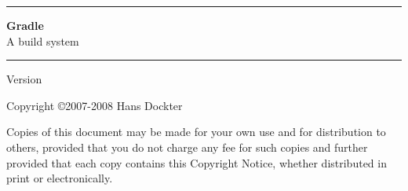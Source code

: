 \documentclass[10pt,oneside,a4paper,titlepage]{book}
\begin{document}
\newcommand\HRule{\noindent\rule{\linewidth}{1.5pt}}
\begin{titlepage}
   \HRule
   \begin{flushleft}
      \Huge {\bf Gradle} \\
      \LARGE A build system \\
   \end{flushleft}
   \HRule
{}
\begin{center}
    \large Version 
\end{center}
\begin{center}
\large Copyright \copyright  2007-2008 Hans Dockter
\end{center}
\begin{center}
Copies of this document may be made for your own use and for distribution to others, provided that you do not 
charge any fee for such copies and further provided that each copy contains this Copyright Notice, whether 
distributed in print or electronically.
\end{center}   
\end{titlepage}
\tableofcontents
\newpage
{}


 
         
\appendix
 
 
\end{document}
